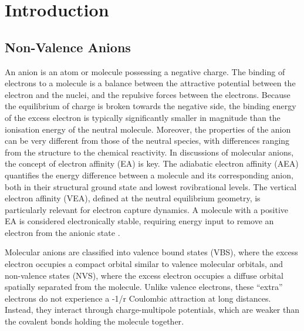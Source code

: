 \chapter{Introduction}\label{ch:introduction}

\section{Non-Valence Anions}
An anion is an atom or molecule possessing a negative charge\cite{simons2008molecular,simons2023molecular,simons2011theoretical,herbert2015quantum}. The binding of electrons to a molecule is a balance between the attractive potential between the electron and the nuclei, and the repulsive forces between the electrons. Because the equilibrium of charge is broken towards the negative side, the binding energy of the excess electron is typically significantly smaller in magnitude than the ionisation energy of the neutral molecule. Moreover, the properties of the anion can be very different from those of the neutral species, with differences ranging from the structure to the chemical reactivity. In discussions of molecular anions, the concept of electron affinity (EA) is key. The adiabatic electron affinity (AEA) quantifies the energy difference between a molecule and its corresponding anion, both in their structural ground state and lowest rovibrational levels. The vertical electron affinity (VEA), defined at the neutral equilibrium geometry, is particularly relevant for electron capture dynamics. A molecule with a positive EA is considered electronically stable, requiring energy input to remove an electron from the anionic state \cite{simons2008molecular}.

Molecular anions are classified into valence bound states (VBS), where the excess electron occupies a compact orbital similar to valence molecular orbitals, and non-valence states (NVS), where the excess electron occupies a diffuse orbital spatially separated from the molecule. Unlike valence electrons, these ``extra'' electrons do not experience a -1/r Coulombic attraction at long distances. Instead, they interact through charge-multipole potentials, which are weaker than the covalent bonds holding the molecule together\cite{simons2008molecular,herbert2015quantum}.

